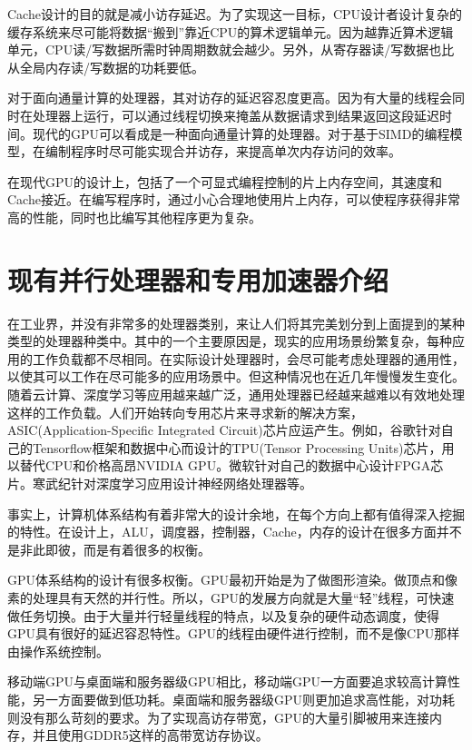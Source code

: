 Cache设计的目的就是减小访存延迟。为了实现这一目标，CPU设计者设计复杂的缓存系统来尽可能将数据“搬到”靠近CPU的算术逻辑单元。因为越靠近算术逻辑单元，CPU读/写数据所需时钟周期数就会越少。另外，从寄存器读/写数据也比从全局内存读/写数据的功耗要低。

对于面向通量计算的处理器，其对访存的延迟容忍度更高。因为有大量的线程会同时在处理器上运行，可以通过线程切换来掩盖从数据请求到结果返回这段延迟时间。现代的GPU可以看成是一种面向通量计算的处理器。对于基于SIMD的编程模型，在编制程序时尽可能实现合并访存，来提高单次内存访问的效率。

在现代GPU的设计上，包括了一个可显式编程控制的片上内存空间，其速度和Cache接近。在编写程序时，通过小心合理地使用片上内存，可以使程序获得非常高的性能，同时也比编写其他程序更为复杂。



\section{现有并行处理器和专用加速器介绍}
在工业界，并没有非常多的处理器类别，来让人们将其完美划分到上面提到的某种类型的处理器种类中。其中的一个主要原因是，现实的应用场景纷繁复杂，每种应用的工作负载都不尽相同。在实际设计处理器时，会尽可能考虑处理器的通用性，以使其可以工作在尽可能多的应用场景中。但这种情况也在近几年慢慢发生变化。随着云计算、深度学习等应用越来越广泛，通用处理器已经越来越难以有效地处理这样的工作负载。人们开始转向专用芯片来寻求新的解决方案，ASIC(Application-Specific Integrated Circuit)芯片应运产生。例如，谷歌针对自己的Tensorflow框架和数据中心而设计的TPU(Tensor Processing Units)芯片，用以替代CPU和价格高昂NVIDIA GPU。微软针对自己的数据中心设计FPGA芯片。寒武纪针对深度学习应用设计神经网络处理器等。

事实上，计算机体系结构有着非常大的设计余地，在每个方向上都有值得深入挖掘的特性。在设计上，ALU，调度器，控制器，Cache，内存的设计在很多方面并不是非此即彼，而是有着很多的权衡。

GPU体系结构的设计有很多权衡。GPU最初开始是为了做图形渲染。做顶点和像素的处理具有天然的并行性。所以，GPU的发展方向就是大量“轻”线程，可快速做任务切换。由于大量并行轻量线程的特点，以及复杂的硬件动态调度，使得GPU具有很好的延迟容忍特性。GPU的线程由硬件进行控制，而不是像CPU那样由操作系统控制。

移动端GPU与桌面端和服务器级GPU相比，移动端GPU一方面要追求较高计算性能，另一方面要做到低功耗。桌面端和服务器级GPU则更加追求高性能，对功耗则没有那么苛刻的要求。为了实现高访存带宽，GPU的大量引脚被用来连接内存，并且使用GDDR5这样的高带宽访存协议。

